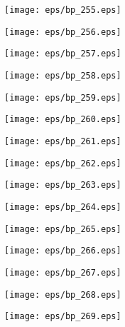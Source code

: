 \documentclass{book}
\begin{document}
	\clearpage\begin{figure}[p]
    \centering
	\texttt{[image: eps/bp\_255.eps]}
	\end{figure}
	\clearpage\begin{figure}[p]
    \centering
	\texttt{[image: eps/bp\_256.eps]}
	\end{figure}
	\clearpage\begin{figure}[p]
    \centering
	\texttt{[image: eps/bp\_257.eps]}
	\end{figure}
	\clearpage\begin{figure}[p]
    \centering
	\texttt{[image: eps/bp\_258.eps]}
	\end{figure}
	\clearpage\begin{figure}[p]
    \centering
	\texttt{[image: eps/bp\_259.eps]}
	\end{figure}
	\clearpage\begin{figure}[p]
    \centering
	\texttt{[image: eps/bp\_260.eps]}
	\end{figure}
	\clearpage\begin{figure}[p]
    \centering
	\texttt{[image: eps/bp\_261.eps]}
	\end{figure}
	\clearpage\begin{figure}[p]
    \centering
	\texttt{[image: eps/bp\_262.eps]}
	\end{figure}
	\clearpage\begin{figure}[p]
    \centering
	\texttt{[image: eps/bp\_263.eps]}
	\end{figure}
	\clearpage\begin{figure}[p]
    \centering
	\texttt{[image: eps/bp\_264.eps]}
	\end{figure}
	\clearpage\begin{figure}[p]
    \centering
	\texttt{[image: eps/bp\_265.eps]}
	\end{figure}
	\clearpage\begin{figure}[p]
    \centering
	\texttt{[image: eps/bp\_266.eps]}
	\end{figure}
	\clearpage\begin{figure}[p]
    \centering
	\texttt{[image: eps/bp\_267.eps]}
	\end{figure}
	\clearpage\begin{figure}[p]
    \centering
	\texttt{[image: eps/bp\_268.eps]}
	\end{figure}
	\clearpage\begin{figure}[p]
    \centering
	\texttt{[image: eps/bp\_269.eps]}
	\end{figure}
\end{document}
